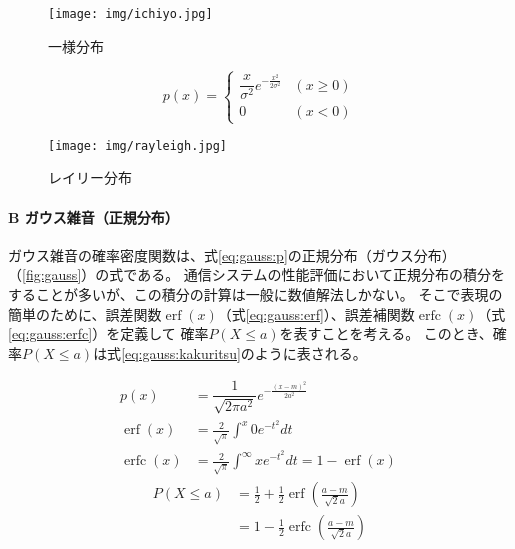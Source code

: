 \documentclass[twocolumn, dvipdfmx, 9pt]{jsarticle}
\begin{document}
  \begin{figure}[h]
    \centering
      \texttt{[image: img/ichiyo.jpg]}
    
    \caption{一様分布}
    \label{fig:ichiyou}
    \end{figure}
      
\begin{equation}\label{eq:rayleigh}
p(x) =
\begin{cases}
  \dfrac{x}{\sigma^2} e ^ {-\frac{x^2}{2\sigma^2}} & (x\ge 0) \\
0 & (x < 0)
\end{cases}
\end{equation}

\begin{figure}[h]
\centering
  \texttt{[image: img/rayleigh.jpg]}

\caption{レイリー分布}
\label{fig:rayleigh}
\end{figure}

\paragraph*{B ガウス雑音（正規分布）}

ガウス雑音の確率密度関数は、式\eqref{eq:gauss:p}の正規分布（ガウス分布）（\ref{fig:gauss}）の式である。
通信システムの性能評価において正規分布の積分をすることが多いが、この積分の計算は一般に数値解法しかない。
そこで表現の簡単のために、誤差関数$\operatorname{erf}(x)$（式\eqref{eq:gauss:erf}）、誤差補関数$\operatorname{erfc}(x)$（式\eqref{eq:gauss:erfc}）を定義して
確率$P(X \le a)$を表すことを考える。
このとき、確率$P(X \le a)$は式\eqref{eq:gauss:kakuritsu}のように表される。

\begin{align}
  \label{eq:gauss:p} p(x) &= \dfrac{1}{\sqrt{2 \pi a^2}} e ^ {- \frac{\left( x - m \right) ^{2}}{2 a ^2}} \\
  \label{eq:gauss:erf} \operatorname{erf}(x) &= \frac{2}{\sqrt{\pi}} \int^{x}{0}e^{-t^2} dt \\
  \label{eq:gauss:erfc} \operatorname{erfc}(x) &= \frac{2}{\sqrt{\pi}} \int^{\infty}{x}e^{-t^2} dt = 1 - \operatorname{erf}(x) \
\end{align}
\begin{equation}
  \begin{aligned}\label{eq:gauss:kakuritsu}
    P(X \le a) &= \frac{1}{2} + \frac{1}{2} \operatorname{erf} \left( \frac{a - m}{\sqrt{2}a} \right) \\
    &= 1 - \frac{1}{2} \operatorname{erfc} \left( \frac{a - m}{\sqrt{2}a} \right)
  \end{aligned}
\end{equation}
\end{document}
